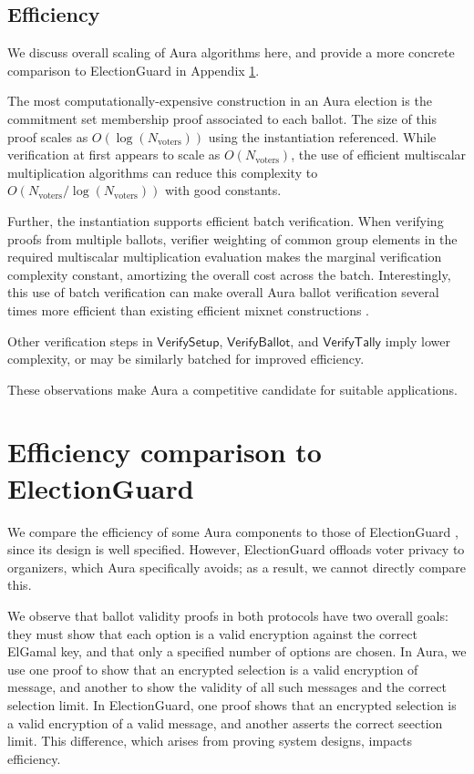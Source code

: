 \documentclass{llncs}
\newcommand{\func}[1]{\mathsf{#1}}
\begin{document}
\subsection{Efficiency}

We discuss overall scaling of Aura algorithms here, and provide a more concrete comparison to ElectionGuard in Appendix \ref{app:efficiency}.

The most computationally-expensive construction in an Aura election is the commitment set membership proof associated to each ballot.
The size of this proof scales as $O(\log(N_{\text{voters}}))$ using the instantiation referenced.
While verification at first appears to scale as $O(N_{\text{voters}})$, the use of efficient multiscalar multiplication algorithms \cite{pippenger} can reduce this complexity to $O(N_{\text{voters}}/\log(N_{\text{voters}}))$ with good constants.

Further, the instantiation supports efficient batch verification.
When verifying proofs from multiple ballots, verifier weighting of common group elements in the required multiscalar multiplication evaluation makes the marginal verification complexity constant, amortizing the overall cost across the batch.
Interestingly, this use of batch verification can make overall Aura ballot verification several times more efficient than existing efficient mixnet constructions \cite{efficient_shuffle,groth_shuffle}.

Other verification steps in $\func{VerifySetup}$, $\func{VerifyBallot}$, and $\func{VerifyTally}$ imply lower complexity, or may be similarly batched for improved efficiency.

These observations make Aura a competitive candidate for suitable applications.






\appendix


\section{Efficiency comparison to ElectionGuard}
\label{app:efficiency}

We compare the efficiency of some Aura components to those of ElectionGuard \cite{electionguard}, since its design is well specified.
However, ElectionGuard offloads voter privacy to organizers, which Aura specifically avoids; as a result, we cannot directly compare this.

We observe that ballot validity proofs in both protocols have two overall goals: they must show that each option is a valid encryption against the correct ElGamal key, and that only a specified number of options are chosen.
In Aura, we use one proof to show that an encrypted selection is a valid encryption of  message, and another to show the validity of all such messages and the correct selection limit.
In ElectionGuard, one proof shows that an encrypted selection is a valid encryption of a valid message, and another asserts the correct seection limit.
This difference, which arises from proving system designs, impacts efficiency.
\end{document}
